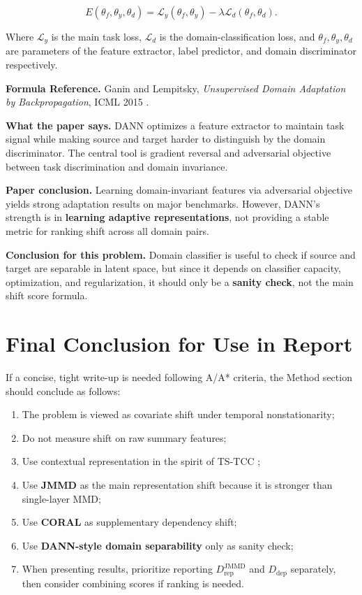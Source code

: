 \documentclass[a4paper]{article}
\begin{document}
\[
E(\theta_f,\theta_y,\theta_d)
= \mathcal{L}_y(\theta_f,\theta_y)
- \lambda \mathcal{L}_d(\theta_f,\theta_d).
\]

Where \(\mathcal{L}_y\) is the main task loss, \(\mathcal{L}_d\) is the domain-classification loss, and \(\theta_f, \theta_y, \theta_d\) are parameters of the feature extractor, label predictor, and domain discriminator respectively.

\textbf{Formula Reference.} Ganin and Lempitsky, \emph{Unsupervised Domain Adaptation by Backpropagation}, ICML 2015 \cite{dann}.

\textbf{What the paper says.} DANN optimizes a feature extractor to maintain task signal while making source and target harder to distinguish by the domain discriminator. The central tool is gradient reversal and adversarial objective between task discrimination and domain invariance.

\textbf{Paper conclusion.} Learning domain-invariant features via adversarial objective yields strong adaptation results on major benchmarks. However, DANN's strength is in \textbf{learning adaptive representations}, not providing a stable metric for ranking shift across all domain pairs.

\textbf{Conclusion for this problem.} Domain classifier is useful to check if source and target are separable in latent space, but since it depends on classifier capacity, optimization, and regularization, it should only be a \textbf{sanity check}, not the main shift score formula.

\section{Final Conclusion for Use in Report}

If a concise, tight write-up is needed following A/A* criteria, the Method section should conclude as follows:
\begin{enumerate}[label=\arabic*.]
    \item The problem is viewed as covariate shift under temporal nonstationarity;
    \item Do not measure shift on raw summary features;
    \item Use contextual representation in the spirit of TS-TCC \cite{tstcc};
    \item Use \textbf{JMMD} \cite{jan} as the main representation shift because it is stronger than single-layer MMD;
    \item Use \textbf{CORAL} \cite{coral} as supplementary dependency shift;
    \item Use \textbf{DANN-style domain separability} \cite{dann} only as sanity check;
    \item When presenting results, prioritize reporting \(D_{\mathrm{rep}}^{\mathrm{JMMD}}\) and \(D_{\mathrm{dep}}\) separately, then consider combining scores if ranking is needed.
\end{enumerate}
\end{document}
